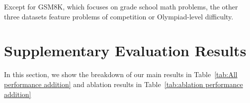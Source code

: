 Except for GSM8K, which focuses on grade school math problems, the other three datasets feature problems of competition or Olympiad-level difficulty.
\section{Supplementary Evaluation Results}
\label{app: supplementary results}
In this section, we show the breakdown of our main results in Table~\ref{tab:All performance addition} and ablation results in Table~\ref{tab:ablation performance addition}

\begin{table*}[h]
\centering    

\vspace{-10pt}
\caption{Breakdown of evaluation results of different models on ProcessBench. 
The best result is given in bold, and the second-best value is underlined. 
}
\vspace{-5pt}

\label{tab:All performance addition}
\end{table*}
